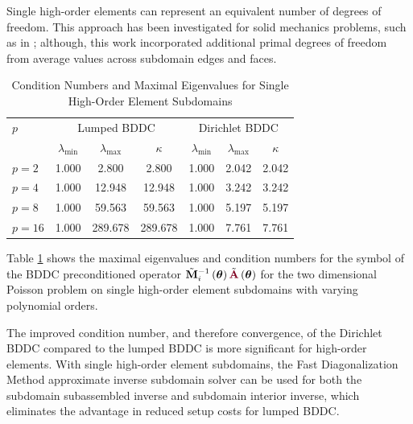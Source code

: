 Single high-order elements can represent an equivalent number of degrees of freedom.
This approach has been investigated for solid mechanics problems, such as in \cite{pavarino2010bddc}; although, this work incorporated additional primal degrees of freedom from average values across subdomain edges and faces.

\begin{table}[ht!]
\begin{center}
\begin{tabular}{l ccc ccc}
  \toprule
  $p$  &  \multicolumn{3}{c}{Lumped BDDC}  &  \multicolumn{3}{c}{Dirichlet BDDC}  \\
                      &  $\lambda_{\text{min}}$  &  $\lambda_{\text{max}}$  &  $\kappa$ & $\lambda_{\text{min}}$  &  $\lambda_{\text{max}}$ & $\kappa$  \\
  \toprule
  $p = 2$   &  1.000  &    2.800  &    2.800  &  1.000  &  2.042  &  2.042  \\
  $p = 4$   &  1.000  &   12.948  &   12.948  &  1.000  &  3.242  &  3.242  \\
  $p = 8$   &  1.000  &   59.563  &   59.563  &  1.000  &  5.197  &  5.197  \\
  $p = 16$  &  1.000  &  289.678  &  289.678  &  1.000  &  7.761  &  7.761  \\
  \bottomrule
\end{tabular}
\end{center}
\caption{Condition Numbers and Maximal Eigenvalues for Single High-Order Element Subdomains}
\label{table:high_order_element_bddc}
\end{table}

Table \ref{table:high_order_element_bddc} shows the maximal eigenvalues and condition numbers for the symbol of the BDDC preconditioned operator $\tilde{\mathbf{M}}^{-1}_i \left( \boldsymbol{\theta} \right) \tilde{{\color{burgundy}\mathbf{A}}} \left( \boldsymbol{\theta} \right)$ for the two dimensional Poisson problem on single high-order element subdomains with varying polynomial orders.

The improved condition number, and therefore convergence, of the Dirichlet BDDC compared to the lumped BDDC is more significant for high-order elements.
With single high-order element subdomains, the Fast Diagonalization Method approximate inverse subdomain solver can be used for both the subdomain subassembled inverse and subdomain interior inverse, which eliminates the advantage in reduced setup costs for lumped BDDC.

